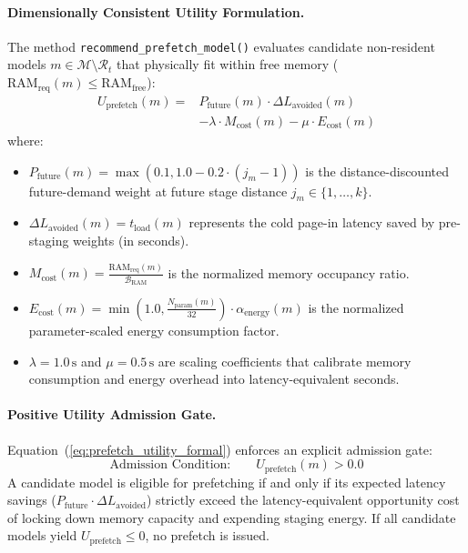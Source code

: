 \paragraph{Dimensionally Consistent Utility Formulation.}
The method \texttt{recommend\_prefetch\_model()} evaluates candidate non-resident models $m \in \mathcal{M} \setminus \mathcal{R}_t$ that physically fit within free memory ($\text{RAM}_{\text{req}}(m) \le \text{RAM}_{\text{free}}$):
\begin{equation}
\begin{aligned}
U_{\text{prefetch}}(m) = &P_{\text{future}}(m) \cdot \Delta L_{\text{avoided}}(m) \\
&- \lambda \cdot M_{\text{cost}}(m) - \mu \cdot E_{\text{cost}}(m)
\end{aligned}
\label{eq:prefetch_utility_formal}
\end{equation}
where:
\begin{itemize}
    \item $P_{\text{future}}(m) = \max(0.1, 1.0 - 0.2 \cdot (j_m - 1))$ is the distance-discounted future-demand weight at future stage distance $j_m \in \{1, \dots, k\}$.
    \item $\Delta L_{\text{avoided}}(m) = t_{\text{load}}(m)$ represents the cold page-in latency saved by pre-staging weights (in seconds).
    \item $M_{\text{cost}}(m) = \frac{\text{RAM}_{\text{req}}(m)}{\mathcal{B}_{\text{RAM}}}$ is the normalized memory occupancy ratio.
    \item $E_{\text{cost}}(m) = \min(1.0, \frac{N_{\text{param}}(m)}{32}) \cdot \alpha_{\text{energy}}(m)$ is the normalized parameter-scaled energy consumption factor.
    \item $\lambda = 1.0\,\text{s}$ and $\mu = 0.5\,\text{s}$ are scaling coefficients that calibrate memory consumption and energy overhead into latency-equivalent seconds.
\end{itemize}

\paragraph{Positive Utility Admission Gate.}
Equation~(\ref{eq:prefetch_utility_formal}) enforces an explicit admission gate:
\begin{equation}
\text{Admission Condition:} \qquad U_{\text{prefetch}}(m) > 0.0
\end{equation}
A candidate model is eligible for prefetching if and only if its expected latency savings ($P_{\text{future}} \cdot \Delta L_{\text{avoided}}$) strictly exceed the latency-equivalent opportunity cost of locking down memory capacity and expending staging energy. If all candidate models yield $U_{\text{prefetch}} \le 0$, no prefetch is issued.

